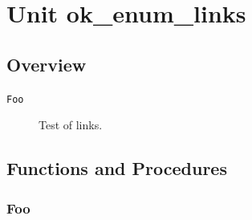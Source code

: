 \documentclass{report}
\newif\ifpdf
\begin{document}
\label{toc}\tableofcontents
\newpage
\newlength{\tmplength}
\chapter{Unit ok{\_}enum{\_}links}
\label{ok_enum_links}
\section{Overview}
\begin{description}
\item[\texttt{Foo}]Test of links.
\end{description}
\section{Functions and Procedures}
\ifpdf
\subsection*{\large{\textbf{Foo}}\normalsize\hspace{1ex}\hrulefill}
\else
\end{document}
